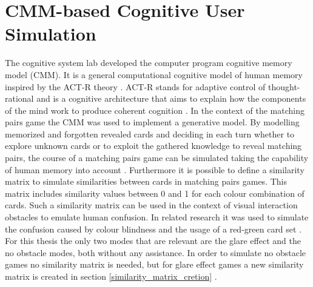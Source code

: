 \chapter{CMM-based Cognitive User Simulation}
\label{simulator}
The cognitive system lab developed the computer program cognitive memory model (CMM).
It is a general computational cognitive model of human memory inspired by the ACT-R theory \cite{salous_putze_2018esann}. ACT-R stands for adaptive control of thought-rational and is a cognitive architecture that aims to explain how the components of the mind work to produce coherent cognition \cite{actr}. In the context of the matching pairs game the CMM was used to implement a generative model. By modelling memorized and forgotten revealed cards and deciding in each turn whether to explore unknown cards or to exploit the gathered knowledge to reveal matching pairs, the course of a matching pairs game can be simulated taking the capability of human memory into account \cite{memory}. Furthermore it is possible to define a similarity matrix to simulate similarities between cards in matching pairs games. This matrix includes similarity values between 0 and 1 for each colour combination of cards. Such a similarity matrix can be used in the context of visual interaction obstacles to emulate human confusion. In related research it was used to simulate the confusion caused by colour blindness and the usage of a red-green card set \cite{blind}. %
For this thesis the only two modes that are relevant are the glare effect and the no obstacle modes, both without any assistance. In order to simulate no obstacle games no similarity matrix is needed, but for glare effect games a new similarity matrix is created in section \ref{similarity_matrix_cretion} .


